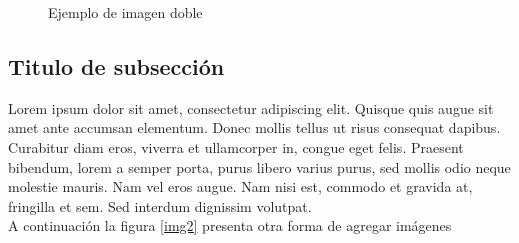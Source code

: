\documentclass[11pt,letterpaper]{article}
\begin{document}
\begin{figure}[ht!]
\hspace{1cm} %
\caption{Ejemplo de imagen doble}\label{img1}
\end{figure}

\subsection{Titulo de subsección}

Lorem ipsum dolor sit amet, consectetur adipiscing elit. Quisque quis augue sit amet ante accumsan elementum. Donec mollis tellus ut risus consequat dapibus. Curabitur diam eros, viverra et ullamcorper in, congue eget felis. Praesent bibendum, lorem a semper porta, purus libero varius purus, sed mollis odio neque molestie mauris. Nam vel eros augue. Nam nisi est, commodo et gravida at, fringilla et sem. Sed interdum dignissim volutpat.\\ %

A continuación la figura \ref{img2} presenta otra forma de agregar imágenes
\end{document}

